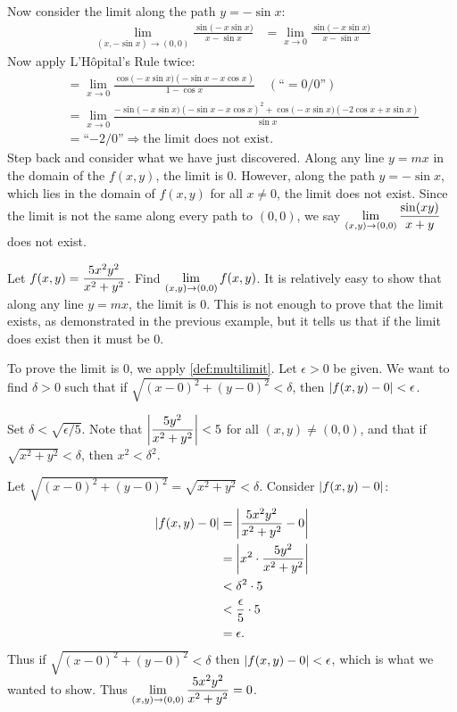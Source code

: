 \begin{example}
\begin{enumerate}
	Now consider the limit along the path $y=-\sin x$:
	\begin{align*}
	\lim_{(x,-\sin x)\to (0,0)} \frac{\sin\bigl(-x\sin x\bigr)}{x-\sin x} &= \lim_{x\to0} \frac{\sin\bigl(-x\sin x\bigr)}{x-\sin x}
	\end{align*}
	Now apply L'Hôpital's Rule twice:
	\small
	\begin{align*}
	 \quad &= \lim_{x\to 0}\frac{\cos\bigl(-x\sin x\bigr)(-\sin x-x\cos x)}{1-\cos x} \quad \left(\text{``}= 0/0\text{''}\right)\\
	&= \lim_{x\to 0}\frac{-\sin\bigl(-x\sin x\bigr)(-\sin x-x\cos x)^2+\cos\bigl(-x\sin x\bigr)(-2\cos x+x\sin x)}{\sin x}\\
	&= \text{``$-2/0$''} \Rightarrow \text{the limit does not exist.}
	\end{align*}
	\normalsize
Step back and consider what we have just discovered. Along any line $y=mx$ in the domain of the $f(x,y)$, the limit is 0. However, along the path $y=-\sin x$, which lies in the domain of  $f(x,y)$ for all $x\neq 0$, the limit does not exist. Since the limit is not the same along every path to $(0,0)$, we say $\displaystyle \lim_{(x,y)\to (0,0)}\frac{\sin(xy)}{x+y}$ does not exist.
\end{enumerate}
\end{example}

\begin{example}\label{ex_multilimit5}%
Let $\displaystyle f(x,y) = \frac{5x^2y^2}{x^2+y^2}$. Find $\displaystyle\lim_{(x,y)\to (0,0)}  f(x,y)$.
\solution
It is relatively easy to show that along any line $y=mx$, the limit is 0. This is not enough to prove that the limit exists, as demonstrated in the previous example, but it tells us that if the limit does exist then it must be 0.

To prove the limit is 0, we apply \autoref{def:multilimit}. Let $\epsilon >0$ be given. We want to find $\delta >0$ such that if $\sqrt{(x-0)^2+(y-0)^2} <\delta$, then $\left\lvert f(x,y)-0 \right\rvert<\epsilon$.

Set $\delta < \sqrt{\epsilon/5}$. Note that $\left\lvert \dfrac{5y^2}{x^2+y^2} \right\rvert<5$ for all $(x,y)\neq (0,0)$, and that if $\sqrt{x^2+y^2} <\delta$, then $x^2<\delta^2$.

Let $\sqrt{(x-0)^2+(y-0)^2} = \sqrt{x^2+y^2}<\delta$. Consider $\left\lvert f(x,y)-0 \right\rvert$:
{\allowdisplaybreaks
\begin{align*}
\left\lvert f(x,y)-0 \right\rvert&= \left\lvert \frac{5x^2y^2}{x^2+y^2}-0 \right\rvert \\
				&= \left\lvert x^2\cdot\frac{5y^2}{x^2+y^2} \right\rvert\\
				&< \delta^2\cdot 5 \\
				&< \frac{\epsilon}{5}\cdot 5 \\
				&= \epsilon.
\end{align*}}
Thus if $\sqrt{(x-0)^2+(y-0)^2}<\delta$ then $\left\lvert f(x,y)-0 \right\rvert<\epsilon$, which is what we wanted to show. Thus $\displaystyle \lim_{(x,y)\to(0,0)} \frac{5x^2y^2}{x^2+y^2} = 0$.
\end{example}

